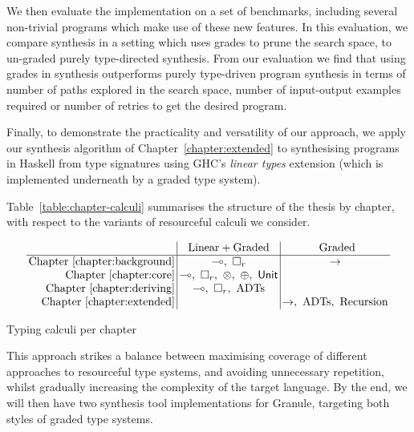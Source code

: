 \begin{enumerate}
        We then evaluate the implementation on a set of benchmarks, including
        several non-trivial programs which make use of these new features. In
        this evaluation, we compare synthesis in a setting which uses grades to
        prune the search space, to un-graded purely type-directed synthesis.
        From our evaluation we find that using grades in synthesis outperforms
        purely type-driven program synthesis in terms of number of paths
        explored in the search space, number of input-output examples required
        or number of retries to get the desired program.
        
        Finally, to demonstrate the practicality and versatility of our
        approach, we apply our synthesis algorithm of
        Chapter~\ref{chapter:extended} to synthesising programs in Haskell from
        type signatures using GHC's \emph{linear types} extension (which is
        implemented underneath by a graded type system).

\end{enumerate}

Table~\ref{table:chapter-calculi} summarises the structure of the thesis by chapter, with respect 
to the variants of resourceful calculi we consider.
\begin{table}[H]
\begin{align*}
\setlength{\arraycolsep}{0.2em}
\begin{array}{r|c|c}
      & \text{ Linear} + \text{Graded } & \text{ Graded}\\
      \hline
      \text{Chapter~\ref{chapter:background}} & \multimap,\ \Box_r & \rightarrow \\
      \text{Chapter~\ref{chapter:core}} & \multimap,\ \Box_r,\ \otimes,\ \oplus,\ \mathsf{Unit} &  \\
      \text{Chapter~\ref{chapter:deriving}} & \multimap,\ \Box_r,\ \text{ADTs} & \\
      \text{Chapter~\ref{chapter:extended}} & & \rightarrow,\ \text{ADTs},\ \text{Recursion}
\end{array}
\end{align*}
\caption{Typing calculi per chapter}
\label{table:chapter-calculi}
\end{table}

This approach strikes a balance between maximising coverage of different
approaches to resourceful type systems, and avoiding unnecessary repetition,
whilst gradually increasing the complexity of the target language. By the end, we
will then have two synthesis tool implementations for Granule, targeting both
styles of graded type systems.

